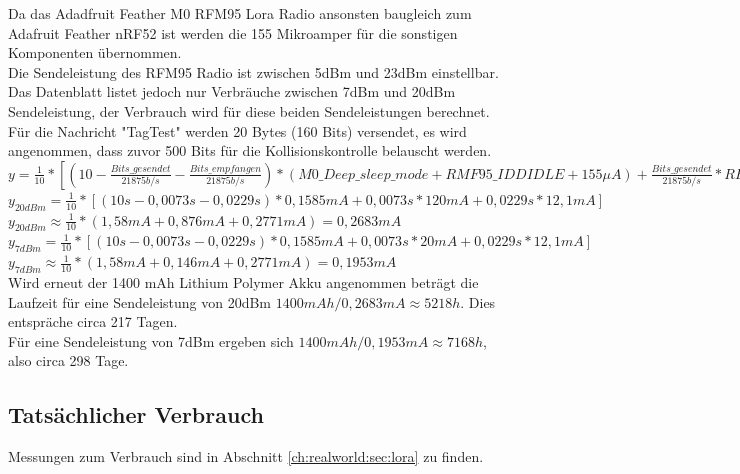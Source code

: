 Da das Adadfruit Feather M0 RFM95 Lora Radio ansonsten baugleich zum Adafruit Feather nRF52 ist werden die 155 Mikroamper für die sonstigen Komponenten übernommen.\\
Die Sendeleistung des RFM95 Radio ist zwischen 5dBm und 23dBm einstellbar. 
Das Datenblatt listet jedoch nur Verbräuche zwischen 7dBm und 20dBm Sendeleistung, der Verbrauch wird für diese beiden Sendeleistungen berechnet.
Für die Nachricht "TagTest" werden 20 Bytes (160 Bits) versendet, es wird angenommen, dass zuvor 500 Bits für die Kollisionskontrolle belauscht werden.\\[1cm]

$y = \frac{1}{10} * [(10 - \frac{Bits\_gesendet}{21875 b/s} - \frac{Bits\_empfangen}{21875 b/s}) * (M0\_Deep\_sleep\_mode + RMF95\_IDDIDLE + 155 {\mu}A) + \frac{Bits\_gesendet}{21875 b/s} * RFM95\_XdBm + \frac{Bits\_empfangen}{21875 b/s} * RFM95\_IDDR]$\\[0.5cm]
$y_{20dBm} = \frac{1}{10} * [(10s - 0,0073s - 0,0229s) * 0,1585mA + 0,0073s * 120mA + 0,0229s * 12,1mA]$\\[0.5cm]
$y_{20dBm} \approx \frac{1}{10} * (1,58mA + 0,876mA + 0,2771mA) = 0,2683mA$\\[1cm]

$y_{7dBm} = \frac{1}{10} * [(10s - 0,0073s - 0,0229s) * 0,1585mA + 0,0073s * 20mA + 0,0229s * 12,1mA]$\\[0.5cm]
$y_{7dBm} \approx \frac{1}{10} * (1,58mA + 0,146mA + 0,2771mA) = 0,1953mA$\\[1cm]

Wird erneut der 1400 mAh Lithium Polymer Akku angenommen beträgt die Laufzeit für eine Sendeleistung von 20dBm $1400mAh / 0,2683mA \approx 5218h$.
Dies entspräche circa 217 Tagen.\\
Für eine Sendeleistung von 7dBm ergeben sich $1400mAh / 0,1953mA \approx 7168h$, also circa 298 Tage.


\subsection{Tatsächlicher Verbrauch}
Messungen zum Verbrauch sind in Abschnitt \ref{ch:realworld:sec:lora} zu finden.
